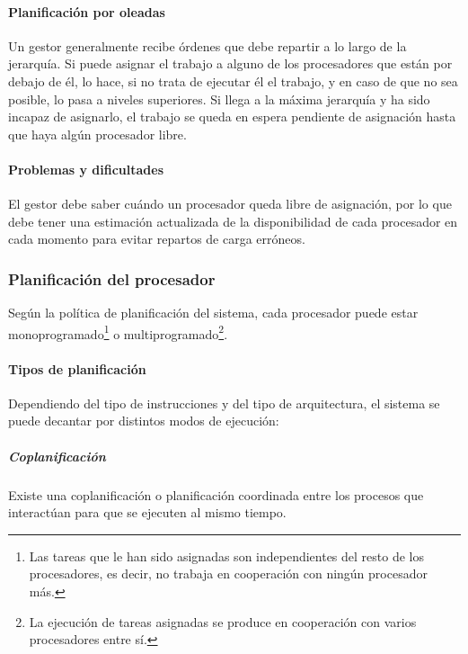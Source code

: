 \documentclass[a4paper, 11pt, titlepage]{article}
\begin{document}
            \paragraph{Planificación por oleadas} Un gestor generalmente recibe órdenes que debe repartir 
            a lo largo de la jerarquía. Si puede asignar el trabajo a alguno de los procesadores que están 
            por debajo de él, lo hace, si no trata de ejecutar él el trabajo, y en caso de que no sea 
            posible, lo pasa a niveles superiores. Si llega a la máxima jerarquía y ha sido incapaz de 
            asignarlo, el trabajo se queda en espera pendiente de asignación hasta que haya algún procesador 
            libre.

            \paragraph{Problemas y dificultades} El gestor debe saber cuándo un procesador queda libre de 
            asignación, por lo que debe tener una estimación actualizada de la disponibilidad de cada 
            procesador en cada momento para evitar repartos de carga erróneos.

        \subsubsection{Planificación del procesador}

            Según la política de planificación del sistema, cada procesador puede estar monoprogramado\footnote{
                Las tareas que le han sido asignadas son independientes del resto de los procesadores, es decir, no trabaja  en  cooperación  con  ningún  procesador  más.
            }
            o multiprogramado\footnote{
                La ejecución de tareas asignadas se produce en cooperación con varios procesadores entre sí.
            }.

            \paragraph{Tipos de planificación}

                Dependiendo del tipo de instrucciones y del tipo de arquitectura, el sistema se puede 
                decantar por distintos modos de ejecución:

                \subparagraph{Coplanificación}

                    Existe una coplanificación o planificación coordinada entre los procesos que 
                    interactúan para que se ejecuten al mismo tiempo.
\end{document}
